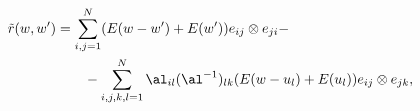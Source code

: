 \begin{equation}
\begin{split}
\tilde r(w,w')&=\sum_{i,j=1}^N (E(w-w')
+E(w')) e_{ij}\otimes e_{ji}- \\
&\qquad -\sum_{i,j,k,l=1}^N \al_{il}(\al^{-1})_{lk} 
(E(w-u_l) + E(u_l)) e_{ij}\otimes e_{jk},
\label{onA}
\end{split}
\end{equation}

